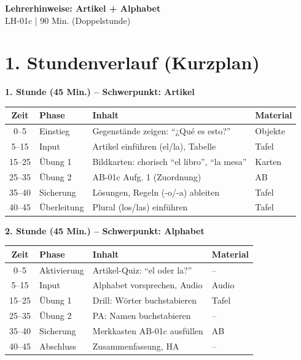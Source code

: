 \documentclass[11pt, a4paper]{article}
\newcommand{\fachfarbe}{spanisch}
\newcommand{\thema}{Artikel + Alphabet}
\newcommand{\sequenz}{01}
\newcommand{\block}{c}
\newcommand{\dauer}{90 Min. (Doppelstunde)}
\begin{document}

\begin{center}
    {\Large\bfseries\textcolor{\fachfarbe}{Lehrerhinweise: \thema}}\\[0.3em]
    {\normalsize LH-\sequenz\block{} | \dauer}
\end{center}

\vspace{10pt}


\section*{1. Stundenverlauf (Kurzplan)}

\textbf{1. Stunde (45 Min.) -- Schwerpunkt: Artikel}

\begin{tabularx}{\textwidth}{|c|l|X|l|}
\hline
\textbf{Zeit} & \textbf{Phase} & \textbf{Inhalt} & \textbf{Material} \\
\hline
0--5 & Einstieg & Gegenstände zeigen: ``¿Qué es esto?'' & Objekte \\
\hline
5--15 & Input & Artikel einführen (el/la), Tabelle & Tafel \\
\hline
15--25 & Übung 1 & Bildkarten: chorisch ``el libro'', ``la mesa'' & Karten \\
\hline
25--35 & Übung 2 & AB-01c Aufg. 1 (Zuordnung) & AB \\
\hline
35--40 & Sicherung & Lösungen, Regeln (-o/-a) ableiten & Tafel \\
\hline
40--45 & Überleitung & Plural (los/las) einführen & Tafel \\
\hline
\end{tabularx}

\vspace{1em}

\textbf{2. Stunde (45 Min.) -- Schwerpunkt: Alphabet}

\begin{tabularx}{\textwidth}{|c|l|X|l|}
\hline
\textbf{Zeit} & \textbf{Phase} & \textbf{Inhalt} & \textbf{Material} \\
\hline
0--5 & Aktivierung & Artikel-Quiz: ``el oder la?'' & -- \\
\hline
5--15 & Input & Alphabet vorsprechen, Audio & Audio \\
\hline
15--25 & Übung 1 & Drill: Wörter buchstabieren & Tafel \\
\hline
25--35 & Übung 2 & PA: Namen buchstabieren & -- \\
\hline
35--40 & Sicherung & Merkkasten AB-01c ausfüllen & AB \\
\hline
40--45 & Abschluss & Zusammenfassung, HA & -- \\
\hline
\end{tabularx}
\end{document}
